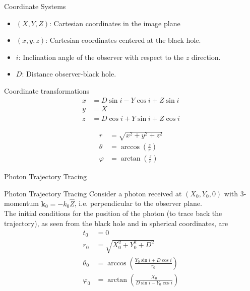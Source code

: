 \documentclass{beamer}
\begin{document}
\begin{darkframes}

\begin{frame}{Coordinate Systems}
    \begin{itemize}
    \item $(X,Y,Z)$: Cartesian coordinates in the image plane
    \pause
    \item $(x,y,z)$: Cartesian coordinates centered at the black hole.
    \pause
    \item $i$: Inclination angle of the observer with respect to the $z$ direction.
    \pause
    \item $D$: Distance observer-black hole.
    \end{itemize}
\end{frame}

\begin{frame}{Coordinate transformations}
	\begin{align*}
    x &= D\sin i - Y \cos i + Z\sin i\\
    y &= X\\
    z &= D\cos i + Y \sin i + Z\cos i
    \end{align*}
    
    \begin{align*}
    r &= \sqrt{x^2 + y^2 + z^2}\\
    \theta &= \arccos \left( \frac{z}{r} \right)\\
    \varphi &= \arctan \left( \frac{z}{r} \right)
    \end{align*}
\end{frame}

\begin{frame}
	\huge
    {Photon Trajectory Tracing}
\end{frame}

\begin{frame}{Photon Trajectory Tracing}
	Consider a photon received at $(X_0,Y_0,0)$ with 3-momentum $\textbf{k}_0 = -k_0 \hat{Z}$, i.e. perpendicular to the observer plane.\\
	
	The initial conditions for the position of the photon (to trace back the trajectory), as seen from the black hole and in spherical coordinates, are
    \begin{align*}
	t_0 &= 0\\     
    r_0 &= \sqrt{X_0^2 + Y_0^2 + D^2}\\
    \theta_0 &= \arccos \left( \frac{Y_0 \sin i + D \cos i}{r_0} \right)\\
    \varphi_0 &= \arctan \left( \frac{X_0}{D \sin i - Y_0 \cos i} \right)
    \end{align*}
\end{frame}


\end{darkframes}
\end{document}
